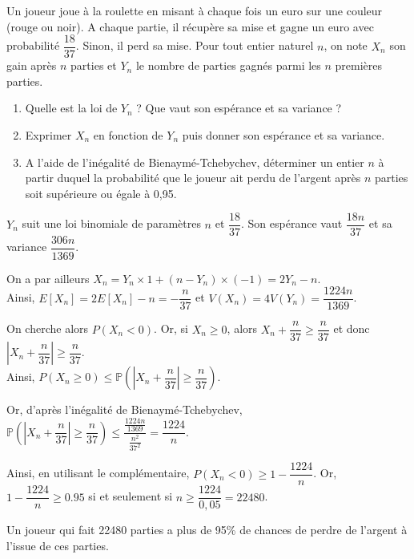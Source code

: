 \documentclass[11pt,fleqn, openany]{book} %
\begin{document}
\begin{exercise}[topic=lgn03]Un joueur joue à la roulette en misant à chaque fois un euro sur une couleur (rouge ou noir). A chaque partie, il récupère sa mise et gagne un euro avec probabilité $\dfrac{18}{37}$. Sinon, il perd sa mise. Pour tout entier naturel $n$, on note $X_n$ son gain après $n$ parties et $Y_n$ le nombre de parties gagnés parmi les $n$ premières parties.
\begin{enumerate}
\item Quelle est la loi de $Y_n$ ? Que vaut son espérance et sa variance ?
\item Exprimer $X_n$ en fonction de $Y_n$ puis donner son espérance et sa variance.
\item A l'aide de l'inégalité de Bienaymé-Tchebychev, déterminer un entier $n$ à partir duquel la probabilité que le joueur ait perdu de l'argent après $n$ parties soit supérieure ou égale à 0,95.
\end{enumerate}\end{exercise}

\begin{solution}$Y_n$ suit une loi binomiale de paramètres $n$ et $\dfrac{18}{37}$. Son espérance vaut $\dfrac{18n}{37}$ et sa variance $\dfrac{306n}{1369}$.

On a par ailleurs $X_n=Y_n \times 1 + (n-Y_n) \times (-1)=2Y_n-n$.\\ Ainsi, $E[X_n]=2E[X_n]-n=-\dfrac{n}{37}$ et $V(X_n)=4V(Y_n)=\dfrac{1224n}{1369}$.

On cherche alors $P(X_n <0)$. Or, si $X_n \geqslant 0$, alors $X_n+\dfrac{n}{37} \geqslant  \dfrac{n}{37}$ et donc $\left| X_n + \dfrac{n}{37} \right| \geqslant \dfrac{n}{37}$. \\Ainsi, $P(X_n \geqslant 0) \leqslant \mathbb{P}\left(\left| X_n + \dfrac{n}{37} \right| \geqslant \dfrac{n}{37}\right)$.

Or, d'après l'inégalité de Bienaymé-Tchebychev, $\mathbb{P}\left(\left| X_n + \dfrac{n}{37} \right| \geqslant \dfrac{n}{37}\right)  \leqslant \dfrac{\frac{1224n}{1369}}{\frac{n^2}{37^2}}=\dfrac{1224}{n}$. 

Ainsi, en utilisant le complémentaire, $P(X_n <0) \geqslant 1-\dfrac{1224}{n}$. Or, $1-\dfrac{1224}{n} \geqslant 0.95$ si et seulement si $n \geqslant \dfrac{1224}{0,05}=22480$. 

Un joueur qui fait 22480 parties a plus de 95\% de chances de perdre de l'argent à l'issue de ces parties.\end{solution}
\end{document}
